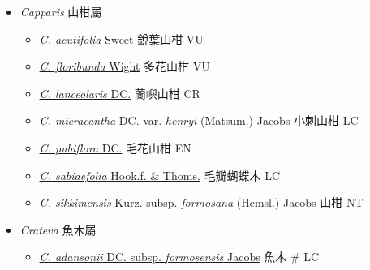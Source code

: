 
  \begin{itemize}
 \item[] \textit{Capparis} 山柑屬
                                
  \begin{itemize}
        \item[] \href{http://www.theplantlist.org/tpl1.1/search?q=Capparis+acutifolia}{\textit{C. acutifolia} Sweet}   銳葉山柑   VU
        \item[] \href{http://www.theplantlist.org/tpl1.1/search?q=Capparis+floribunda}{\textit{C. floribunda} Wight}   多花山柑   VU
        \item[] \href{http://www.theplantlist.org/tpl1.1/search?q=Capparis+lanceolaris}{\textit{C. lanceolaris} DC.}   蘭嶼山柑   CR
        \item[] \href{http://www.theplantlist.org/tpl1.1/search?q=Capparis+micracantha+var.+henryi}{\textit{C. micracantha} DC. var. \textit{henryi} (Matsum.) Jacobs}   小刺山柑   LC
        \item[] \href{http://www.theplantlist.org/tpl1.1/search?q=Capparis+pubiflora}{\textit{C. pubiflora} DC.}   毛花山柑   EN
        \item[] \href{http://www.theplantlist.org/tpl1.1/search?q=Capparis+sabiaefolia}{\textit{C. sabiaefolia} Hook.f. \& Thoms.}   毛瓣蝴蝶木   LC
        \item[] \href{http://www.theplantlist.org/tpl1.1/search?q=Capparis+sikkimensis+subsp.+formosana}{\textit{C. sikkimensis} Kurz. subsp. \textit{formosana} (Hemsl.) Jacobs}   山柑   NT
  \end{itemize}
 \item[] \textit{Crateva} 魚木屬
                                
  \begin{itemize}
        \item[] \href{http://www.theplantlist.org/tpl1.1/search?q=Crateva+adansonii+subsp.+formosensis}{\textit{C. adansonii} DC. subsp. \textit{formosensis} Jacobs}   魚木  \# LC
  \end{itemize}
  \end{itemize}
